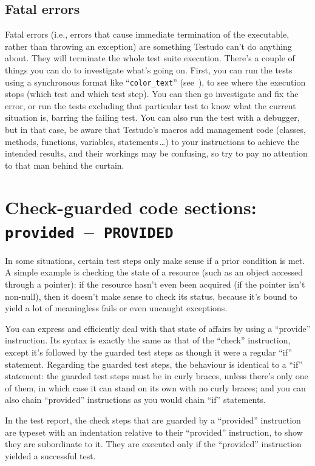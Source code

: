 \documentclass[twoside, a4paper, article]{memoir}
\newcommand*\testudocolor{\color{red!80!blue}}
\newcommand*\testudo[1]{\texttt{\testudocolor{}#1}}
\newcommand*\testudopair[2]{\testudo{#1}~--~\testudo{#2}}
\newcommand\chaptertestudopair[3]{%
  \chapter[#1]{#1: \testudopair{#2}{#3}}}
\providecommand\typesetexample[1]{%
}
\newcommand*\ellipsis{\,\ldots}
\begin{document}
\section{Fatal errors}
\label{sec:fatal-errors}

Fatal errors (i.e., errors that cause immediate termination of the executable,
rather than throwing an exception) are something Testudo can't do anything
about.  They will terminate the whole test suite execution.  There's a couple
of things you can do to investigate what's going on.  First, you can run the
tests using a synchronous format like ``\texttt{color\_text}''
(see~), to see where the execution stops (which
test and which test step).  You can then go investigate and fix the error, or
run the tests excluding that particular test to know what the current situation
is, barring the failing test.  You can also run the test with a debugger, but
in that case, be aware that Testudo's macros add management code (classes,
methods, functions, variables, statements\ellipsis{}) to your instructions to
achieve the intended results, and their workings may be confusing, so try to
pay no attention to that man behind the curtain.


\chaptertestudopair{Check-guarded code sections}{provided}{PROVIDED}
\label{cha:check-guarded-code-sections}

In some situations, certain test steps only make sense if a prior condition is
met.  A simple example is checking the state of a resource (such as an object
accessed through a pointer): if the resource hasn't even been acquired (if the
pointer isn't non-null), then it doesn't make sense to check its status,
because it's bound to yield a lot of meaningless fails or even uncaught
exceptions.

You can express and efficiently deal with that state of affairs by using a
``provide'' instruction.  Its syntax is exactly the same as that of the
``check'' instruction, except it's followed by the guarded test steps as though
it were a regular ``if'' statement.  Regarding the guarded test steps, the
behaviour is identical to a ``if'' statement: the guarded test steps must be in
curly braces, unless there's only one of them, in which case it can stand on
its own with no curly braces; and you can also chain ``provided'' instructions
as you would chain ``if'' statements.

\typesetexample{provided}

In the test report, the check steps that are guarded by a ``provided''
instruction are typeset with an indentation relative to their ``provided''
instruction, to show they are subordinate to it.  They are executed only if the
``provided'' instruction yielded a successful test.
\end{document}
